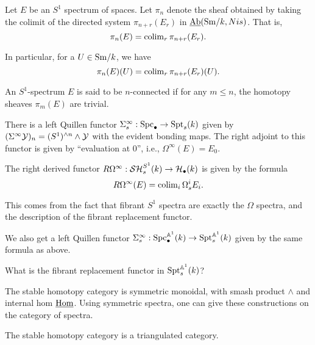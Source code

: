 \documentclass{amsart}%
\begin{document}
\begin{definition}
  Let $E$ be an $S^1$ spectrum of spaces. Let $\pi_n$ denote the sheaf
  obtained by taking the colimit of the directed system
  $\pi_{n+r}(E_r)$ in $\operatorname{\underline{Ab}}(\mathrm{Sm}/k,Nis)$. That is,
  \begin{equation*}
    \pi_n(E) = \operatorname{colim}_{r} \pi_{n+r}(E_r). 
  \end{equation*}

  In particular, for a $U \in \mathrm{Sm}/k$, we have 
  \begin{equation*}
    \pi_n(E)(U) = \operatorname{colim}_{r} \pi_{n+r}(E_r)(U).
  \end{equation*}
\end{definition}

\begin{definition}
  An $S^1$-spectrum $E$ is said to be $n$-connected if for any
  $m\leq n$, the homotopy sheaves $\pi_m(E)$ are trivial.
\end{definition}

\begin{definition}
  There is a left Quillen functor
  $\Sigma^{\infty}_s : \mathrm{Spc}_{\bullet} \to \mathrm{Spt}_s(k)$ given by
  $(\Sigma^{\infty}\mathcal{Y})_n =(S^1)^{\wedge n} \wedge \mathcal{Y}$ with the
  evident bonding maps. The right adjoint to this functor is given by
  ``evaluation at $0$'', i.e., $\Omega^{\infty}(E) = E_0$.
\end{definition}

\begin{remark}
  The right derived functor
  $R\Omega^{\infty} : \mathcal{SH}^{S^1}_s(k) \to \mathcal{H}_{\bullet}(k)$ is given by
  the formula
  \begin{equation*}
    R\Omega^{\infty}(E) = \operatorname{colim}_i \Omega_s^{i}E_i.
  \end{equation*}

  This comes from the fact that fibrant $S^1$ spectra are exactly the
  $\Omega$ spectra, and the description of the fibrant replacement
  functor. 
\end{remark}

\begin{remark}
  We also get a left Quillen functor
  $ \Sigma^{\infty}_s : \mathrm{Spc}_{\bullet}^{\mathbb{A}^1}(k) \to
  \mathrm{Spt}_s^{\mathbb{A}^1}(k)$ given by the same formula as above.

  What is the fibrant replacement functor in $\mathrm{Spt}_s^{\mathbb{A}^1}(k)$?
\end{remark}

\begin{remark}
  The stable homotopy category is symmetric monoidal, with smash
  product $\wedge$ and internal hom $\underline{\operatorname{Hom}}$. Using
  symmetric spectra, one can give these constructions on the category
  of spectra.

  The stable homotopy category is a triangulated category.  
\end{remark}
\end{document}
